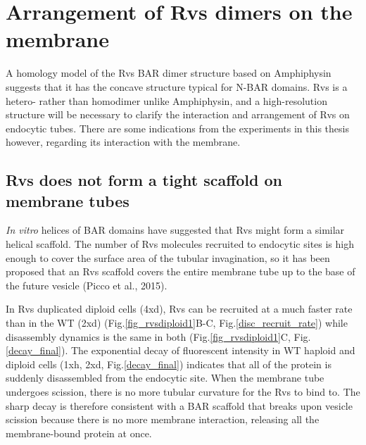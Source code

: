 


\section{Arrangement of Rvs dimers on the membrane}
A homology model of the Rvs BAR dimer structure based on Amphiphysin suggests that it has the concave structure typical for N-BAR domains. Rvs is a hetero- rather than homodimer unlike Amphiphysin, and a high-resolution structure will be necessary to clarify the interaction and arrangement of Rvs on endocytic tubes. There are some indications from the experiments in this thesis however, regarding its interaction with the membrane.



\subsection{Rvs does not form a tight scaffold on membrane tubes}
\textit{In vitro} helices of BAR domains have suggested that Rvs might form a similar helical scaffold. The number of Rvs molecules recruited to endocytic sites is high enough to cover the surface area of the tubular invagination, so it has been proposed that an Rvs scaffold covers the entire membrane tube up to the base of the future vesicle (Picco et al., 2015). 

	\vspace{5mm}
In Rvs duplicated diploid cells (4xd), Rvs can be recruited at a much faster rate than in the WT (2xd) (Fig.\ref{fig_rvsdiploid1}B-C, Fig.\ref{disc_recruit_rate}) while disassembly dynamics is the same in both (Fig.\ref{fig_rvsdiploid1}C, Fig.\ref{decay_final}). The exponential decay of fluorescent intensity in WT haploid and diploid cells (1xh, 2xd, Fig.\ref{decay_final}) indicates that all of the protein is suddenly disassembled from the endocytic site. When the membrane tube undergoes scission, there is no more tubular curvature for the Rvs to bind to. The sharp decay is therefore consistent with a BAR scaffold that breaks upon vesicle scission because there is no more membrane interaction, releasing all the membrane-bound protein at once. 



